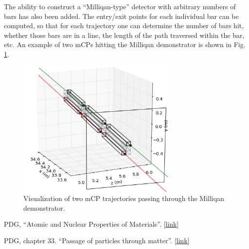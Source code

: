 \documentclass[12pt]{article}
\begin{document}
The ability to construct a ``Milliqan-type'' detector with arbitrary numbers of bars has also been added.
The entry/exit points for each individual bar can be computed, so that for each trajectory one can determine
the number of bars hit, whether those bars are in a line, the length of the path traversed within the bar, etc.
An example of two mCPs hitting the Milliqan demonstrator is shown in Fig. \ref{fig:traj_vis}.

\begin{figure}
\centering
\includegraphics[width=0.7\textwidth]{plots/traj_vis.png}
\caption{Visualization of two mCP trajectories passing through the Milliqan demonstrator.}
\label{fig:traj_vis}
\end{figure}


\begin{thebibliography}{1}

  PDG, ``Atomic and Nuclear Properties of Materials''.
[\href{http://pdg.lbl.gov/2019/AtomicNuclearProperties/index.html}{link}]

  PDG, chapter 33. ``Passage of particles through matter''.
[\href{http://pdg.lbl.gov/2019/reviews/rpp2018-rev-passage-particles-matter.pdf}{link}]
  
\end{thebibliography}
  
\end{document}
